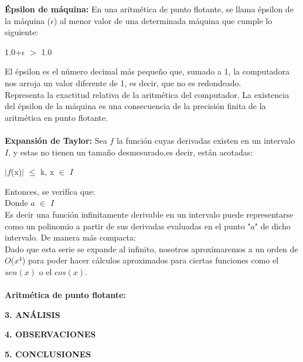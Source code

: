 \documentclass[10pt,a4paper]{article}
\begin{document}
\begin{multicols}{2}
\textbf{\'Epsilon de m\'aquina:}
En una aritm\'etica de punto flotante, se llama \'epsilon de la m\'aquina ($\epsilon$) al menor valor de una determinada máquina que cumple lo siguiente:
\begin{center}
1.0+$\epsilon$ $>$ 1.0
\end{center}
El \'epsilon es el n\'umero decimal más peque\~no que, sumado a 1, la computadora nos arroja un valor diferente de 1, es decir, que no es redondeado.\\
Representa la exactitud relativa de la aritmética del computador. La existencia del \'epsilon de la máquina es una consecuencia de la precisi\'on finita de la aritm\'etica en punto flotante.\\\\
\textbf{Expansi\'on de Taylor:}
Sea $f$ la funci\'on  cuyas derivadas existen en un intervalo $I$, y estas no tienen un tama\~no desmesurado,es decir, est\'an acotadas:
\begin{center}
$|$\(f\)(x)$|$ $\leq$ k,    x \(\in\) $I$
\end{center}
Entonces, se verif\'ica que:\\
\begin{equation}
\end{equation}
Donde $a$ $\in$ $I$ \\
Es decir una funci\'on infinitamente derivable en un intervalo puede representarse como un polinomio a partir de sus derivadas evaluadas en el punto "$a$" de dicho intervalo. De manera más compacta:\\
\begin{equation}
\end{equation}
Dado que esta serie se expande al infinito, nosotros aproximaremos a un orden de $O$($x^{4}$) para poder hacer c\'alculos aproximados para ciertas funciones como el $sen(x)$ o el $cos(x)$.\\\\
\textbf{Aritm\'etica de punto flotante:}
\begin{center}
{\large \bf 3. AN\'ALISIS}	
\end{center}

\begin{center}
{\large \bf 4. OBSERVACIONES}
\end{center}

\begin{center}
{\large \bf 5. CONCLUSIONES}
\end{center}


\end{multicols}
\end{document}
